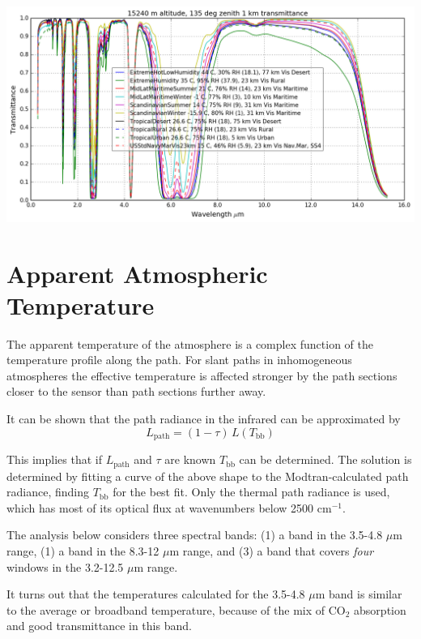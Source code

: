 \documentclass{workpackage}
\begin{document}
\begin{center}
\includegraphics{./pic/Analyse-Standard-Atmospheres_17_22.png}
\end{center}


\section{Apparent Atmospheric Temperature}
\label{sec:ApparentAtmosphericTemperature}

The apparent temperature of the atmosphere is a complex function of the temperature profile along the path.  For slant paths in inhomogeneous atmospheres the effective temperature is affected stronger by the path sections closer to the sensor than path sections further away.


It can be shown that the path radiance in the infrared can be approximated by
\begin{equation}L_\textrm{path} = (1-\tau)\,L(T_\textrm{bb})\end{equation}


This implies that if $L_\textrm{path}$ and $\tau$ are known $T_\textrm{bb}$ can be determined.  The solution is determined by fitting a curve of the above shape to the Modtran-calculated path radiance, finding $T_\textrm{bb}$ for the best fit.  Only the thermal path radiance is used, which has most of its optical flux at wavenumbers below 2500 cm$^{-1}$.


The analysis below considers three spectral bands: (1) a band in the 3.5-4.8 $\mu$m range, (1) a band in the 8.3-12 $\mu$m range, and (3) a band that covers \textit{four} windows in the 3.2-12.5 $\mu$m range.


It turns out that the temperatures calculated for the 3.5-4.8 $\mu$m band is similar to the average or broadband temperature, because of the mix of CO$_2$ absorption and good transmittance in this band.
\end{document}
